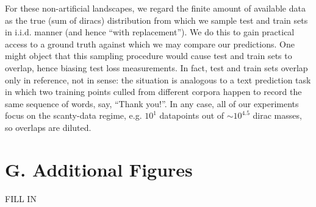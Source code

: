\documentclass{article}
\begin{document}
    For these non-artificial landscapes, we regard the finite amount of
    available data as the true (sum of diracs) distribution from which we
    sample test and train sets in i.i.d.  manner (and hence ``with
    replacement'').  We do this to gain practical access to a ground truth
    against which we may compare our predictions.  One might object that this
    sampling procedure would cause test and train sets to overlap, hence
    biasing test loss measurements.  In fact, test and train sets overlap only
    in reference, not in sense: the situation is analogous to a text prediction
    task in which two training points culled from different corpora happen to
    record the same sequence of words, say, ``Thank you!''.  In any case, all
    of our experiments focus on the scanty-data regime, e.g. $10^1$ datapoints
    out of $\sim 10^{4.5}$ dirac masses, so overlaps are diluted. 

\section*{G. Additional Figures}
    {\color{moor} FILL IN}
\end{document}
